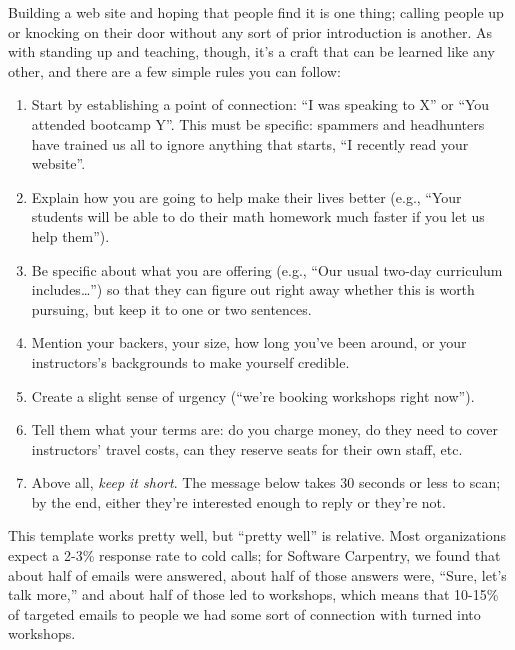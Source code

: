 \documentclass[10pt,statementpaper]{memoir}
\begin{document}
Building a web site and hoping that people find it is one thing; calling
people up or knocking on their door without any sort of prior
introduction is another. As with standing up and teaching, though, it's
a craft that can be learned like any other, and there are a few simple
rules you can follow:

\begin{enumerate}
\def\labelenumi{\arabic{enumi}.}
\item
  Start by establishing a point of connection: ``I was speaking to X''
  or ``You attended bootcamp Y''. This must be specific: spammers and
  headhunters have trained us all to ignore anything that starts, ``I
  recently read your website''.
\item
  Explain how you are going to help make their lives better (e.g.,
  ``Your students will be able to do their math homework much faster if
  you let us help them'').
\item
  Be specific about what you are offering (e.g., ``Our usual two-day
  curriculum includes\ldots{}'') so that they can figure out right away
  whether this is worth pursuing, but keep it to one or two sentences.
\item
  Mention your backers, your size, how long you've been around, or your
  instructors's backgrounds to make yourself credible.
\item
  Create a slight sense of urgency (``we're booking workshops right
  now'').
\item
  Tell them what your terms are: do you charge money, do they need to
  cover instructors' travel costs, can they reserve seats for their own
  staff, etc.
\item
  Above all, \emph{keep it short}. The message below takes 30 seconds or
  less to scan; by the end, either they're interested enough to reply or
  they're not.
\end{enumerate}

This template works pretty well, but ``pretty well'' is relative. Most
organizations expect a 2-3\% response rate to cold calls; for Software
Carpentry, we found that about half of emails were answered, about half
of those answers were, ``Sure, let's talk more,'' and about half of
those led to workshops, which means that 10-15\% of targeted emails to
people we had some sort of connection with turned into workshops.
\end{document}
